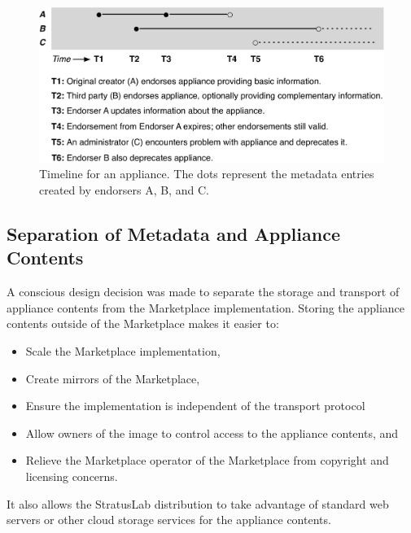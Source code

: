 \begin{figure}
\begin{center}
\includegraphics[width=\columnwidth]{timeline.pdf}
\end{center}
\caption{Timeline for an appliance.  The dots represent the metadata
  entries created by endorsers A, B, and C\@.}
\label{fig:timeline}
\end{figure}

\subsection{Separation of Metadata and Appliance Contents}

A conscious design decision was made to separate the storage and
transport of appliance contents from the Marketplace implementation.
Storing the appliance contents outside of the Marketplace makes it
easier to:
\begin{itemize}
\item Scale the Marketplace implementation,
\item Create mirrors of the Marketplace,
\item Ensure the implementation is independent of the transport
  protocol
\item Allow owners of the image to control access to the appliance
  contents, and
\item Relieve the Marketplace operator of the Marketplace from
  copyright and licensing concerns.
\end{itemize}
It also allows the StratusLab distribution to take advantage of
standard web servers or other cloud storage services for the appliance
contents.

